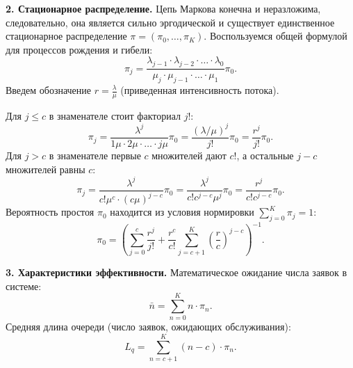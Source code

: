 \begin{eproof}
\begin{center}
\end{center}

\textbf{2. Стационарное распределение.}
Цепь Маркова конечна и неразложима, следовательно, она является сильно эргодической и существует единственное стационарное распределение $\pi = (\pi_0, \dots, \pi_K)$.
Воспользуемся общей формулой для процессов рождения и гибели:
$$
\pi_j = \frac{\lambda_{j-1} \cdot \lambda_{j-2} \cdot \dots \cdot \lambda_0}{\mu_j \cdot \mu_{j-1} \cdot \dots \cdot \mu_1} \pi_0.
$$
Введем обозначение $r = \frac{\lambda}{\mu}$ (приведенная интенсивность потока). 

Для $j \le c$ в знаменателе стоит факториал $j!$:
$$
\pi_j = \frac{\lambda^j}{1\mu \cdot 2\mu \cdot \dots \cdot j\mu} \pi_0 = \frac{(\lambda/\mu)^j}{j!} \pi_0 = \frac{r^j}{j!} \pi_0.
$$
Для $j > c$ в знаменателе первые $c$ множителей дают $c!$, а остальные $j-c$ множителей равны $c$:
$$
\pi_j = \frac{\lambda^j}{c!\mu^c \cdot (c\mu)^{j-c}} \pi_0 = \frac{\lambda^j}{c! c^{j-c} \mu^j} \pi_0 = \frac{r^j}{c! c^{j-c}} \pi_0.
$$
Вероятность простоя $\pi_0$ находится из условия нормировки $\sum_{j=0}^K \pi_j = 1$:
$$
\pi_0 = \left( \sum_{j=0}^{c} \frac{r^j}{j!} + \frac{r^c}{c!} \sum_{j=c+1}^{K} \left(\frac{r}{c}\right)^{j-c} \right)^{-1}.
$$

\textbf{3. Характеристики эффективности.}
Математическое ожидание числа заявок в системе:
$$
\bar{n} = \sum_{n=0}^{K} n \cdot \pi_n.
$$
Средняя длина очереди (число заявок, ожидающих обслуживания):
$$
L_q = \sum_{n=c+1}^{K} (n-c) \cdot \pi_n.
$$
\end{eproof}

